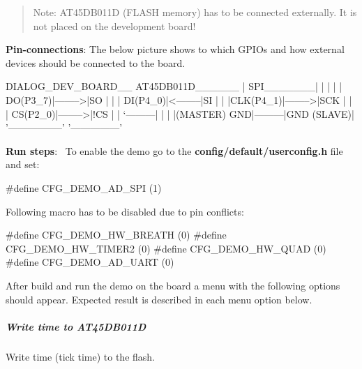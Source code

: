 \begin{quote}
Note\+: A\+T45\+D\+B011\+D (F\+L\+A\+S\+H memory) has to be connected externally. It is not placed on the development board! \end{quote}



\begin{DoxyItemize}
\item {\bfseries Pin-\/connections}\+: The below picture shows to which G\+P\+I\+Os and how external devices should be connected to the board.
\end{DoxyItemize}


\begin{DoxyPre}
   DIALOG\_DEV\_BOARD\_\_          AT45DB011D\_\_\_\_\_\_
   |       SPI\_\_\_\_\_\_\_|         |               |
   |       | DO(P3\_7)|-------->|SO             |
   |       | DI(P4\_0)|<--------|SI             |
   |       |CLK(P4\_1)|-------->|SCK            |
   |       | CS(P2\_0)|-------->|!CS            |
   |       `---------|         |               |
   |(MASTER)      GND|---------|GND     (SLAVE)|
   '-----------------'         '---------------'
\end{DoxyPre}



\begin{DoxyItemize}
\item {\bfseries Run steps}\+:~\newline
 To enable the demo go to the {\bfseries \textquotesingle{}config/default/userconfig.\+h\textquotesingle{}} file and set\+: 
\begin{DoxyCode}
\textcolor{preprocessor}{#define CFG\_DEMO\_AD\_SPI      (1)}
\end{DoxyCode}
 Following macro has to be disabled due to pin conflicts\+: 
\begin{DoxyCode}
\textcolor{preprocessor}{#define CFG\_DEMO\_HW\_BREATH   (0)}
\textcolor{preprocessor}{#define CFG\_DEMO\_HW\_TIMER2   (0)}
\textcolor{preprocessor}{#define CFG\_DEMO\_HW\_QUAD     (0)}
\textcolor{preprocessor}{#define CFG\_DEMO\_AD\_UART     (0)}
\end{DoxyCode}
 After build and run the demo on the board a menu with the following options should appear. Expected result is described in each menu option below.
\end{DoxyItemize}

\subparagraph*{Write time to A\+T45\+D\+B011\+D}

Write time (tick time) to the flash.

